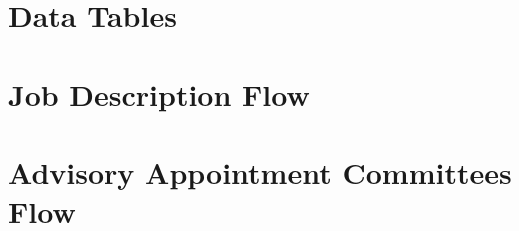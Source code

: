 \section{Data Tables}

\section{Job Description Flow}

\section{Advisory Appointment Committees Flow}